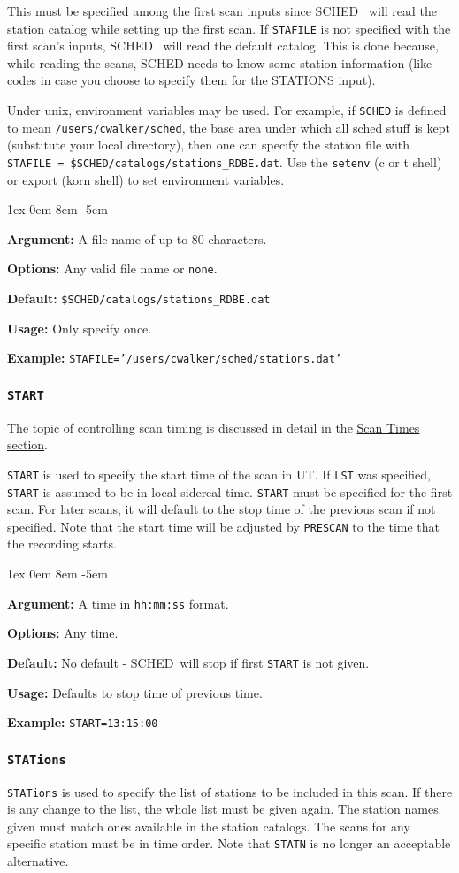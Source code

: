 \documentclass{report}
\newcommand{\schedb}{{\sc SCHED~}}
\newcommand{\rcwbox}[5]{
  \begin{list}{}{\parsep 1ex  \itemsep 0em
                 \leftmargin 8em  \itemindent -5em }
    \item {\bf Argument:} #1
    \item {\bf Options:}  #2
    \item {\bf Default:}  #3
    \item {\bf Usage:}    #4
    \item {\bf Example:}  #5
  \end{list}
}
\begin{document}
This must be specified among the first scan inputs since \schedb
will read the station catalog while setting up the first scan.  If
{\tt STAFILE} is not specified with the first scan's inputs, \schedb
will read the default catalog.  This is done because, while reading
the scans, SCHED needs to know some station information (like codes
in case you choose to specify them for the STATIONS input).

Under unix, environment variables may be used.  For example, if
{\tt SCHED} is defined to mean {\tt /users/cwalker/sched}, the
base area under which all sched stuff is kept (substitute your
local directory), then one can specify the station file with
{\tt STAFILE = \$SCHED/catalogs/stations\_RDBE.dat}.  Use the {\tt setenv}
(c or t shell) or export (korn shell) to set environment variables.

\rcwbox
{A file name of up to 80 characters.}
{Any valid file name or {\tt none}.}
{{\tt \$SCHED/catalogs/stations\_RDBE.dat}}
{Only specify once.}
{{\tt STAFILE='/users/cwalker/sched/stations.dat'}}


\subsubsection{\label{MP:START}{\tt START}}

The topic of controlling scan timing is discussed in detail in
the 
{\hyperref[SSEC:SCANTIMES]{Scan Times section}}.

{\tt START} is used to specify the start time of the scan in UT. If
{\tt LST} was specified, {\tt START} is assumed to be in local
sidereal time. {\tt START} must be specified for the first scan. For
later scans, it will default to the stop time of the previous scan if
not specified.  Note that the start time will be adjusted by
{\tt PRESCAN} to the time that the recording starts.

\rcwbox
{A time in {\tt hh:mm:ss} format.}
{Any time.}
{No default - \schedb will stop if first {\tt START} is not
given.}
{Defaults to stop time of previous time.}
{{\tt START=13:15:00}}


\subsubsection{\label{MP:STATIONS}{\tt STATions}}

{\tt STATions} is used to specify the list of stations to be included
in this scan. If there is any change to the list, the whole list
must be given again. The station names given must match ones
available in the station catalogs. The scans for any specific station
must be in time order.  Note that {\tt STATN} is no longer an
acceptable alternative.
\end{document}
